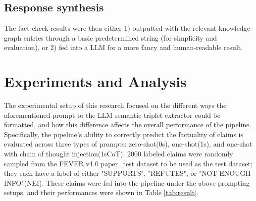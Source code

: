\documentclass[11pt]{article}
\begin{document}
\subsection{Response synthesis}
The fact-check results were then either 1) outputted with the relevant knowledge graph entries through a basic predetermined string (for simplicity and evaluation), or 2) fed into a LLM for a more fancy and human-readable result. 

\section{Experiments and Analysis}
The experimental setup of this research focused on the different ways the aforementioned prompt to the LLM semantic triplet extractor could be formatted, and how this difference affects the overall performance of the pipeline. Specifically, the pipeline's ability to correctly predict the factuality of claims is evaluated across three types of prompts: zero-shot(0s), one-shot(1s), and one-shot with chain of thought injection(1sCoT). 2000 labeled claims were randomly sampled from the FEVER v1.0 paper\_test dataset to be used as the test dataset; they each have a label of either "SUPPORTS", "REFUTES", or "NOT ENOUGH INFO"(NEI). These claims were fed into the pipeline under the above prompting setups, and their performances were shown in Table \ref{tab:result}.
\end{document}
